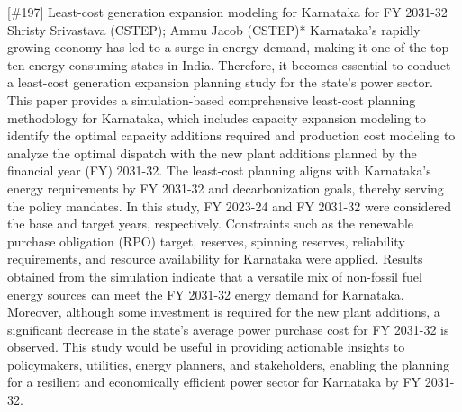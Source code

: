 {} \begin{abstract_online} {[\#197] Least-cost generation expansion modeling for Karnataka for FY 2031-32} {} {Shristy Srivastava (CSTEP); Ammu Jacob (CSTEP)*} {} Karnataka's rapidly growing economy has led to a surge in energy demand, making it one of the top ten energy-consuming states in India. Therefore, it becomes essential to conduct a least-cost generation expansion planning study for the state's power sector. This paper provides a simulation-based comprehensive least-cost planning methodology for Karnataka, which includes capacity expansion modeling to identify the optimal capacity additions required and production cost modeling to analyze the optimal dispatch with the new plant additions planned by the financial year (FY) 2031-32. The least-cost planning aligns with Karnataka's energy requirements by FY 2031-32 and decarbonization goals, thereby serving the policy mandates. In this study, FY 2023-24 and FY 2031-32 were considered the base and target years, respectively. Constraints such as the renewable purchase obligation (RPO) target, reserves, spinning reserves, reliability requirements, and resource availability for Karnataka were applied. Results obtained from the simulation indicate that a versatile mix of non-fossil fuel energy sources can meet the FY 2031-32 energy demand for Karnataka. Moreover, although some investment is required for the new plant additions, a significant decrease in the state's average power purchase cost for FY 2031-32 is observed. This study would be useful in providing actionable insights to policymakers, utilities, energy planners, and stakeholders, enabling the planning for a resilient and economically efficient power sector for Karnataka by FY 2031-32. \end{abstract_online} 
